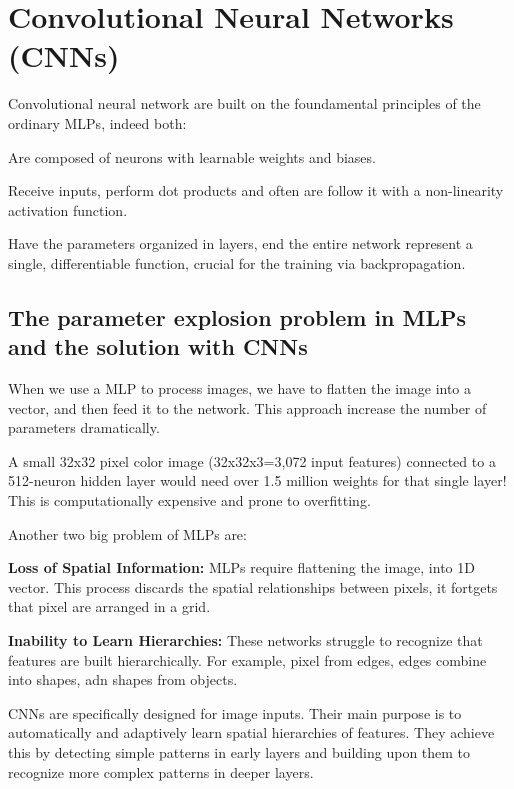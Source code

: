 \chapter{Convolutional Neural Networks (CNNs)}
Convolutional neural network are built on the foundamental principles of the ordinary MLPs, indeed both:
\begin{compactitemize}
    \item Are composed of neurons with learnable weights and biases.
    \item Receive inputs, perform dot products and often are follow it with a non-linearity activation function.
    \item Have the parameters organized in layers, end the entire network represent a single, differentiable function, crucial for the training via backpropagation.
\end{compactitemize}

\section{The parameter explosion problem in MLPs and the solution with CNNs}
When we use a MLP to process images, we have to flatten the image into a vector, and then feed it to the network. This approach increase the number of parameters dramatically.
\begin{examplebox}
    A small 32x32 pixel color image (32x32x3=3,072 input features) connected to a 512-neuron hidden layer would need over 1.5 million weights for that single layer! This is computationally expensive and prone to overfitting.
\end{examplebox}
Another two big problem of MLPs are:
\begin{compactitemize}
    \item \textbf{Loss of Spatial Information:} MLPs require flattening the image, into 1D vector. This process discards the spatial relationships between pixels, it fortgets that pixel are arranged in a grid.
    \item \textbf{Inability to Learn Hierarchies:} These networks struggle to recognize that features are built hierarchically. For example, pixel from edges, edges combine into shapes, adn shapes from objects.
\end{compactitemize}

CNNs are specifically designed for image inputs.
Their main purpose is to automatically and adaptively learn spatial hierarchies of features.
They achieve this by detecting simple patterns in early layers and building upon them to
recognize more complex patterns in deeper layers.

